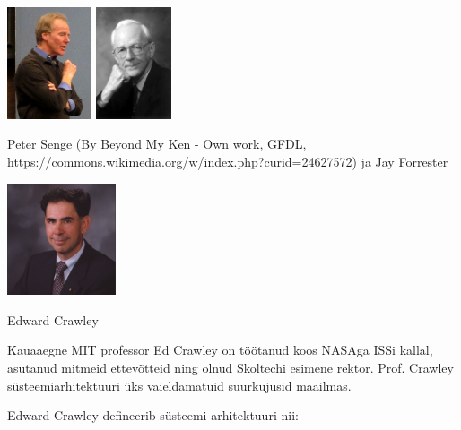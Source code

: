 \documentclass{tufte-book}
\begin{document}
\begin{marginfigure}
	\begin{center}
		\includegraphics[height=3.3cm]{Peter_Senge_at_Quest_to_Learn.jpg}
		\includegraphics[height=3.3cm]{jayforrester.jpg}
		\caption{Peter Senge (By Beyond My Ken - Own work, GFDL, \url{https://commons.wikimedia.org/w/index.php?curid=24627572}) ja Jay Forrester}
		\label{fig:legendid}
	\end{center}
\end{marginfigure}


\begin{marginfigure}
	\begin{center}
		\includegraphics[height=3.3cm]{MIT-Ed-Crawley_0.jpg}
		\caption{Edward Crawley}
		\label{fig:ed}
	\end{center}
	Kauaaegne MIT professor Ed Crawley on töötanud koos NASAga ISSi kallal, asutanud mitmeid ettevõtteid ning olnud Skoltechi esimene rektor. Prof. Crawley süsteemiarhitektuuri üks vaieldamatuid suurkujusid maailmas.
\end{marginfigure}

Edward Crawley defineerib süsteemi arhitektuuri nii:
\end{document}

